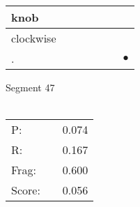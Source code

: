 \documentclass[landscape]{article}
\newcommand{\ssp}{\hspace{2pt}}
\newcommand{\mex}{\cellcolor{g}$\bullet$}
\begin{document}
\begin{tabular}{|l|p{10pt}|p{10pt}|p{10pt}|p{10pt}|p{10pt}|p{10pt}|}
\hline
\ssp knob \ssp&\hspace{2pt}&\hspace{2pt}&\hspace{2pt}&\hspace{2pt}&\hspace{2pt}&\hspace{2pt}\\
\hline
\ssp clockwise \ssp&\hspace{2pt}&\hspace{2pt}&\hspace{2pt}&\hspace{2pt}&\hspace{2pt}&\hspace{2pt}\\
\hline
\ssp \cellcolor{ref5}. \ssp&\hspace{2pt}&\hspace{2pt}&\hspace{2pt}&\hspace{2pt}&\hspace{2pt}&\hspace{2pt}\mex\\
\hline
\end{tabular}

\vspace{6pt}
\noindent Segment 47\\\\
\noindent\begin{tabular}{lm{12pt}r}
\hline
P:&&0.074\\
R:&&0.167\\
Frag:&&0.600\\
Score:&&0.056\\
\end{tabular}

\newpage
\end{document}
